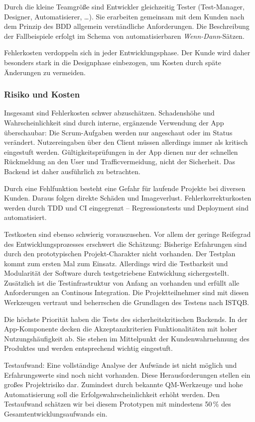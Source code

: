 Durch die kleine Teamgröße sind Entwickler gleichzeitig Tester (Test-Manager, Designer, Automatisierer, \dots).
Sie erarbeiten gemeinsam mit dem Kunden nach dem Prinzip des \ac{BDD} allgemein verständliche Anforderungen. Die Beschreibung der Fallbeispiele erfolgt im Schema von automatisierbaren \textit{Wenn-Dann}-Sätzen.

Fehlerkosten verdoppeln sich in jeder Entwicklungsphase. Der Kunde wird daher besonders stark in die Designphase einbezogen, um Kosten durch späte Änderungen zu vermeiden.

\subsubsection{Risiko und Kosten}
Insgesamt sind Fehlerkosten schwer abzuschätzen. Schadenshöhe und Wahrscheinlichkeit sind durch interne, ergänzende Verwendung der App überschaubar: Die Scrum-Aufgaben werden nur angeschaut oder im Status verändert. Nutzereingaben über den Client müssen allerdings immer als kritisch eingestuft werden. Gültigkeitsprüfungen in der App dienen nur der schnellen Rückmeldung an den User und Trafficvermeidung, nicht der Sicherheit. Das Backend ist daher ausführlich zu betrachten. 

Durch eine Fehlfunktion besteht eine Gefahr für laufende Projekte bei diversen Kunden. Daraus folgen direkte Schäden und Imageverlust. Fehlerkorrekturkosten werden durch TDD und CI eingegrenzt -- Regressionstests und Deployment sind automatisiert.

Testkosten sind ebenso schwierig vorauszusehen. Vor allem der geringe Reifegrad des Entwicklungsprozesses erschwert die Schätzung: Bisherige Erfahrungen sind durch den prototypischen Projekt-Charakter nicht vorhanden. Der Testplan kommt zum ersten Mal zum Einsatz. Allerdings wird die Testbarkeit und Modularität der Software durch testgetriebene Entwicklung sichergestellt. Zusätzlich ist die Testinfrastruktur von Anfang an vorhanden und erfüllt alle Anforderungen an Continous Integration. Die Projektteilnehmer sind mit diesen Werkzeugen vertraut und beherrschen die Grundlagen des Testens nach ISTQB.

Die höchste Priorität haben die Tests des sicherheitskritischen Backends. In der App-Komponente decken die Akzeptanzkriterien Funktionalitäten mit hoher Nutzungshäufigkeit ab. Sie stehen im Mittelpunkt der Kundenwahrnehmung des Produktes und werden entsprechend wichtig eingestuft. 

Testaufwand: Eine vollständige Analyse der Aufwände ist nicht möglich und Erfahrungswerte sind noch nicht vorhanden. Diese Herausforderungen stellen ein großes Projektrisiko dar. Zumindest durch bekannte QM-Werkzeuge und hohe Automatisierung soll die Erfolgswahrscheinlichkeit erhöht werden. Den Testaufwand schätzen wir bei diesem Prototypen mit mindestens 50\,\% des Gesamtentwicklungsaufwands ein.

